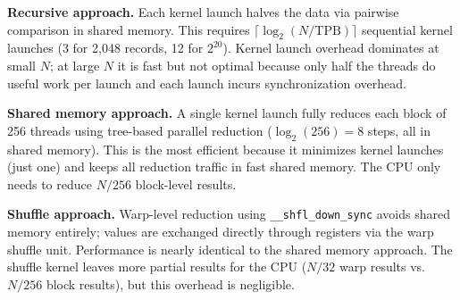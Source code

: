 \documentclass[11pt]{article}
\begin{document}
\textbf{Recursive approach.}
Each kernel launch halves the data via pairwise comparison in shared memory.
This requires $\lceil\log_2(N / \text{TPB})\rceil$ sequential kernel launches (3 for 2{,}048 records, 12 for $2^{20}$).
Kernel launch overhead dominates at small $N$; at large $N$ it is fast but not optimal because only half the threads do useful work per launch and each launch incurs synchronization overhead.

\textbf{Shared memory approach.}
A single kernel launch fully reduces each block of 256 threads using tree-based parallel reduction ($\log_2(256) = 8$ steps, all in shared memory).
This is the most efficient because it minimizes kernel launches (just one) and keeps all reduction traffic in fast shared memory.
The CPU only needs to reduce $N / 256$ block-level results.

\textbf{Shuffle approach.}
Warp-level reduction using \texttt{\_\_shfl\_down\_sync} avoids shared memory entirely; values are exchanged directly through registers via the warp shuffle unit.
Performance is nearly identical to the shared memory approach.
The shuffle kernel leaves more partial results for the CPU ($N/32$ warp results vs.\ $N/256$ block results), but this overhead is negligible.
\end{document}
